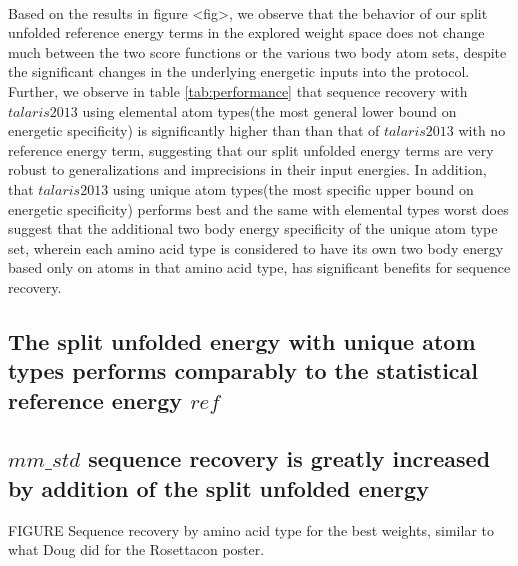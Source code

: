 \paragraph{}
Based on the results in figure <fig>, we observe that the behavior of our split unfolded reference energy terms in the explored weight space does not change much between the two score functions or the various two body atom sets, despite the significant changes in the underlying energetic inputs into the protocol. 
Further, we observe in table \ref{tab:performance} that sequence recovery with $talaris2013$ using elemental atom types(the most general lower bound on energetic specificity) is significantly higher than than that of $talaris2013$ with no reference energy term, suggesting that our split unfolded energy terms are very robust to generalizations and imprecisions in their input energies.
In addition, that $talaris2013$ using unique atom types(the most specific upper bound on energetic specificity) performs best and the same with elemental types worst does suggest that the additional two body energy specificity of the unique atom type set, wherein each amino acid type is considered to have its own two body energy based only on atoms in that amino acid type, has significant benefits for sequence recovery.

\subsection{The split unfolded energy with unique atom types performs comparably to the statistical reference energy $ref$}

\subsection{$mm\_std$ sequence recovery is greatly increased by addition of the split unfolded energy}

FIGURE Sequence recovery by amino acid type for the best weights, similar to what Doug did for the Rosettacon poster.


